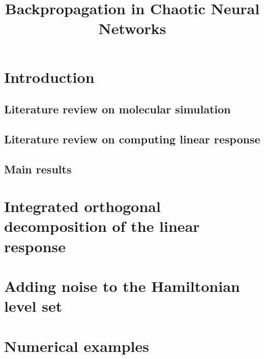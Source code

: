 \documentclass[12pt,a4paper]{amsart}
\title{Backpropagation in Chaotic Neural Networks}
\begin{document}
\maketitle

\section{Introduction}
\subsection{Literature review on molecular simulation}
\subsection{Literature review on computing linear response}

\subsection{Main results}

\section{Integrated orthogonal decomposition of the linear response}

\section{Adding noise to the Hamiltonian level set}

\section{Numerical examples}



{\footnotesize}
\end{document}
